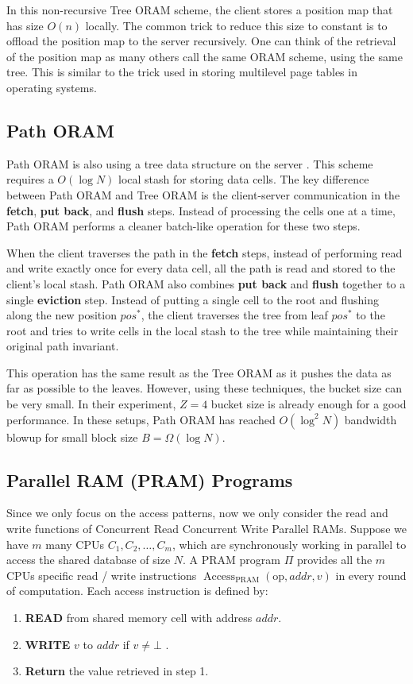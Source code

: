 \documentclass[fontsize=11pt]{article}
\begin{document}
In this non-recursive Tree ORAM scheme, the client stores a position map that has size $O(n)$ locally. The common trick to reduce this size to constant is to offload the position map to the server recursively. One can think of the retrieval of the position map as many others call the same ORAM scheme, using the same tree. This is similar to the trick used in storing multilevel page tables in operating systems. 


\subsection{Path ORAM}
Path ORAM is also using a tree data structure on the server \cite{Path18}. This scheme requires a $O(\log N)$ local stash for storing data cells. The key difference between Path ORAM and Tree ORAM is the client-server communication in the \textbf{fetch}, \textbf{put back}, and \textbf{flush} steps. Instead of processing the cells one at a time, Path ORAM performs a cleaner batch-like operation for these two steps. 

When the client traverses the path in the \textbf{fetch} steps, instead of performing read and write exactly once for every data cell, all the path is read and stored to the client's local stash. 
Path ORAM also combines \textbf{put back} and \textbf{flush} together to a single \textbf{eviction} step. Instead of putting a single cell to the root and flushing along the new position $pos^*$, the client traverses the tree from leaf $pos^*$ to the root and tries to write cells in the local stash to the tree while maintaining their original path invariant. 

This operation has the same result as the Tree ORAM as it pushes the data as far as possible to the leaves. However, using these techniques, the bucket size can be very small. In their experiment, $Z = 4$ bucket size is already enough for a good performance. In these setups, Path ORAM has reached $O(\log ^2 N)$ bandwidth blowup for small block size $B=\Omega(\log N)$. 

\subsection{Parallel RAM (PRAM) Programs}
Since we only focus on the access patterns, now we only consider the read and write functions of Concurrent Read Concurrent Write Parallel RAMs. Suppose we have $m$ many CPUs $C_1, C_2, \ldots, C_m$, which are synchronously working in parallel to access the shared database of size $N$. A PRAM program $\Pi$ provides all the $m$ CPUs specific read / write instructions $\operatorname{Access}_{\text{PRAM}}(\text{op}, addr, v)$ in every round of computation. Each access instruction is defined by: 
\begin{enumerate}
    \item \textbf{READ} from shared memory cell with address $addr$. 
    \item \textbf{WRITE} $v$ to $addr$ if $v \neq \bot$ . 
    \item \textbf{Return} the value retrieved in step 1.
\end{enumerate}
\end{document}
